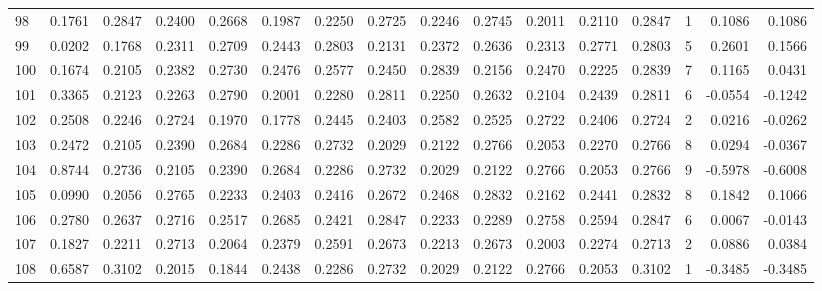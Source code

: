 \begin{tabular}{lrrrrrrrrrrrrrrr}
98  &      0.1761 &  0.2847 &  0.2400 &  0.2668 &  0.1987 &  0.2250 &  0.2725 &  0.2246 &  0.2745 &  0.2011 &   0.2110 &     0.2847 &      1 &                    0.1086 &                     0.1086 \\
99  &      0.0202 &  0.1768 &  0.2311 &  0.2709 &  0.2443 &  0.2803 &  0.2131 &  0.2372 &  0.2636 &  0.2313 &   0.2771 &     0.2803 &      5 &                    0.2601 &                     0.1566 \\
100 &      0.1674 &  0.2105 &  0.2382 &  0.2730 &  0.2476 &  0.2577 &  0.2450 &  0.2839 &  0.2156 &  0.2470 &   0.2225 &     0.2839 &      7 &                    0.1165 &                     0.0431 \\
101 &      0.3365 &  0.2123 &  0.2263 &  0.2790 &  0.2001 &  0.2280 &  0.2811 &  0.2250 &  0.2632 &  0.2104 &   0.2439 &     0.2811 &      6 &                   -0.0554 &                    -0.1242 \\
102 &      0.2508 &  0.2246 &  0.2724 &  0.1970 &  0.1778 &  0.2445 &  0.2403 &  0.2582 &  0.2525 &  0.2722 &   0.2406 &     0.2724 &      2 &                    0.0216 &                    -0.0262 \\
103 &      0.2472 &  0.2105 &  0.2390 &  0.2684 &  0.2286 &  0.2732 &  0.2029 &  0.2122 &  0.2766 &  0.2053 &   0.2270 &     0.2766 &      8 &                    0.0294 &                    -0.0367 \\
104 &      0.8744 &  0.2736 &  0.2105 &  0.2390 &  0.2684 &  0.2286 &  0.2732 &  0.2029 &  0.2122 &  0.2766 &   0.2053 &     0.2766 &      9 &                   -0.5978 &                    -0.6008 \\
105 &      0.0990 &  0.2056 &  0.2765 &  0.2233 &  0.2403 &  0.2416 &  0.2672 &  0.2468 &  0.2832 &  0.2162 &   0.2441 &     0.2832 &      8 &                    0.1842 &                     0.1066 \\
106 &      0.2780 &  0.2637 &  0.2716 &  0.2517 &  0.2685 &  0.2421 &  0.2847 &  0.2233 &  0.2289 &  0.2758 &   0.2594 &     0.2847 &      6 &                    0.0067 &                    -0.0143 \\
107 &      0.1827 &  0.2211 &  0.2713 &  0.2064 &  0.2379 &  0.2591 &  0.2673 &  0.2213 &  0.2673 &  0.2003 &   0.2274 &     0.2713 &      2 &                    0.0886 &                     0.0384 \\
108 &      0.6587 &  0.3102 &  0.2015 &  0.1844 &  0.2438 &  0.2286 &  0.2732 &  0.2029 &  0.2122 &  0.2766 &   0.2053 &     0.3102 &      1 &                   -0.3485 &                    -0.3485 \\

\end{tabular}
